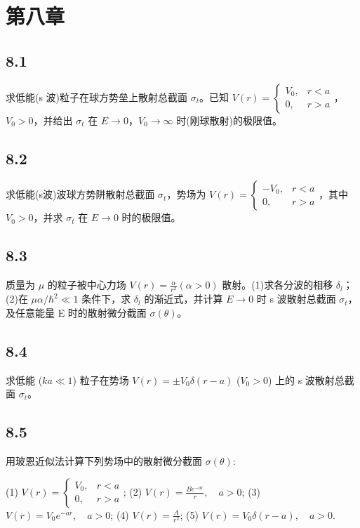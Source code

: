 \section{第八章}

\subsection{8.1}
求低能(s 波)粒子在球方势垒上散射总截面 $\sigma_t$。已知 $V(r) = 
\begin{cases}
V_0, & r < a \\
0, & r > a 
\end{cases}$，
$V_0 > 0$，并给出 $\sigma_t$ 在 $E \to 0$，$V_0 \to \infty$ 时(刚球散射)的极限值。

\subsection{8.2}
求低能(s波)波球方势阱散射总截面 $\sigma_t$，势场为 $V(r) = 
\begin{cases}
-V_0, & r < a \\
0, & r > a
\end{cases}$，其中 $V_0 > 0$，并求 $\sigma_t$ 在 $E \to 0$ 时的极限值。

\subsection{8.3}
质量为 $\mu$ 的粒子被中心力场 $V(r) = \frac{\alpha}{r^2} (\alpha > 0)$ 散射。(1)求各分波的相移 $\delta_l$；(2)在 $\mu \alpha / \hbar^2 \ll 1$ 条件下，求 $\delta_l$ 的渐近式，并计算 $E \to 0$ 时 s 波散射总截面 $\sigma_t$，及任意能量 E 时的散射微分截面 $\sigma(\theta)$。

\subsection{8.4}
求低能 ($ka \ll 1$) 粒子在势场 $V(r) = \pm V_0 \delta(r-a)$ ($V_0 > 0$) 上的 s 波散射总截面 $\sigma_t$。

\subsection{8.5}
用玻恩近似法计算下列势场中的散射微分截面 $\sigma(\theta)$:

(1) $V(r) = 
\begin{cases}
V_0, & r < a \\
0, & r > a
\end{cases}$;
(2) $V(r) = \frac{Be^{-ar}}{r}, \quad a > 0$;
(3) $V(r) = V_0 e^{-ar}, \quad a > 0$;
(4) $V(r) = \frac{A}{r^2}$;
(5) $V(r) = V_0 \delta(r - a), \quad a > 0$.


